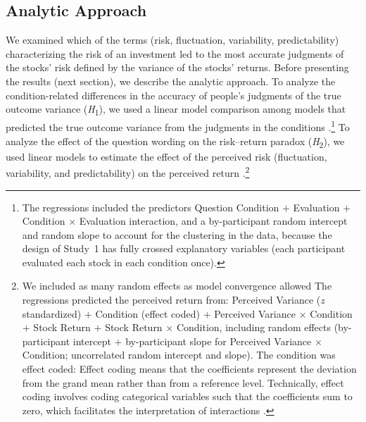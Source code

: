 \documentclass[a4paper,man, natbib,floatsintext]{apa6} %
\begin{document}
\subsection{Analytic Approach}
We examined which of the terms (risk, fluctuation, variability, predictability) characterizing the risk of an investment led to the most accurate judgments of the stocks' risk defined by the variance of the stocks' returns. Before presenting the results (next section), we describe the analytic approach. To analyze the condition-related differences in the accuracy of people's judgments of the true outcome variance (\textit{H}\textsubscript{1}), we used a linear model comparison among models that predicted the true outcome variance from the judgments in the conditions \citep[following][]{Judd2017}.\footnote{The regressions included the predictors Question Condition $+$ Evaluation $+$ Condition $\times$ Evaluation interaction, and a by-participant random intercept and random slope to account for the clustering in the data, because the design of Study~1 has fully crossed explanatory variables (each participant evaluated each stock in each condition once).}
%
To analyze the effect of the question wording on the risk--return paradox (\textit{H}\textsubscript{2}), we used linear models to estimate the effect of the perceived risk (fluctuation, variability, and predictability) on the perceived return \citep[following][]{Judd2017,Barr2013a}.\footnote{We included as many random effects as model convergence allowed \citep[following][]{Judd2017,Barr2013a} The regressions predicted the perceived return from: Perceived Variance (\textit{z} standardized) $+$ Condition (effect coded) $+$ Perceived Variance $\times$ Condition $+$ Stock Return $+$ Stock Return $\times$ Condition, including random effects (by-participant intercept $+$ by-participant slope for Perceived Variance $\times$ Condition; uncorrelated random intercept and slope). The condition was effect coded: Effect coding means that the coefficients represent the deviation from the grand mean rather than from a reference level. Technically, effect coding involves coding categorical variables such that the coefficients sum to zero, which facilitates the interpretation of interactions \citep[e.g.,][]{Singmann2019}.} %
%
\end{document}
